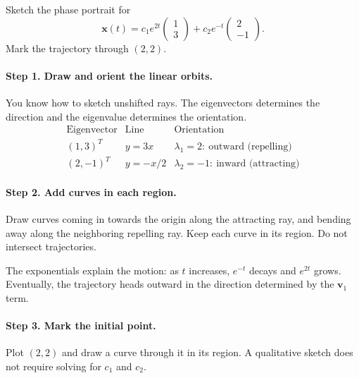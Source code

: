 \documentclass[11pt,letterpaper]{article}
\begin{document}
\begin{example}[4]{
Sketch the phase portrait for
\[
\mathbf{x}(t)=c_1e^{2t}\begin{pmatrix}1\\3\end{pmatrix}
+c_2e^{-t}\begin{pmatrix}2\\-1\end{pmatrix}.
\]
Mark the trajectory through $(2,2)$.
}
\paragraph{Step 1. Draw and orient the linear orbits.} You know how to sketch unshifted rays. The eigenvectors determines the direction and the eigenvalue determines the orientation.  
\[
\begin{array}{c|c|c}
\text{Eigenvector}&\text{Line}&\text{Orientation}\\\hline
(1,3)^T&y=3x&\lambda_1=2:\ \text{outward (repelling)}\\
(2,-1)^T&y=-x/2&\lambda_2=-1:\ \text{inward (attracting)} 
\end{array}
\]
\paragraph{Step 2. Add curves in each region.}
Draw curves coming in towards the origin along the attracting ray, and bending away along the neighboring repelling ray. Keep each curve in its region. Do not intersect trajectories.

The exponentials explain the motion: as $t$ increases, $e^{-t}$ decays
and $e^{2t}$ grows. Eventually, the trajectory heads outward in the
direction determined by the $\mathbf v_1$ term.

\paragraph{Step 3. Mark the initial point.}
Plot $(2,2)$ and draw a curve through it in its region. A qualitative sketch
does not require solving for $c_1$ and $c_2$.


\end{example}
\end{document}

